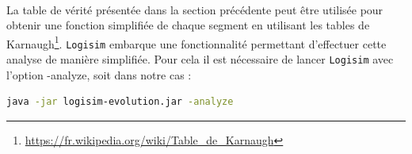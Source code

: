 \documentclass{article}
\begin{document}
    \paragraph{}
    La table de vérité présentée dans la section précédente peut être utilisée pour obtenir une fonction simplifiée de chaque segment en utilisant les tables de Karnaugh\footnote{\url{https://fr.wikipedia.org/wiki/Table_de_Karnaugh}}.
    \texttt{Logisim} embarque une fonctionnalité permettant d'effectuer cette analyse de manière simplifiée.
    Pour cela il est nécessaire de lancer \texttt{Logisim} avec l'option -analyze, soit dans notre cas :

    \begin{lstlisting}[language=bash]
java -jar logisim-evolution.jar -analyze
    \end{lstlisting}
\end{document}
